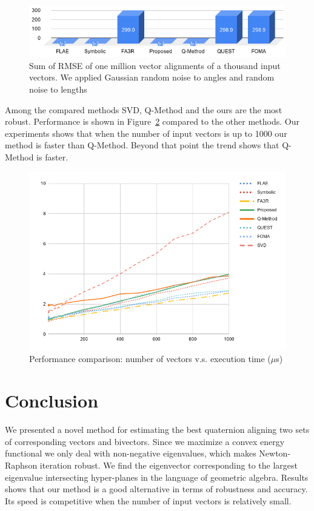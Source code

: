 \documentclass{birkjour}
\numberwithin{equation}{section}
\begin{document}
\begin{figure}[H]
\centering
\includegraphics[width=1.0\textwidth]{robustness.png}
\caption{Sum of RMSE of one million vector alignments of a thousand input vectors. We applied Gaussian random noise to angles and random noise to lengths}
\label{fig:robustness}
\end{figure}

Among the compared methods SVD, Q-Method and the ours are the most robust. Performance is shown in Figure~\ref{fig:time} compared to the other methods. Our experiments shows that when the number of input vectors is up to 1000 our method is faster than Q-Method. Beyond that point the trend shows that Q-Method is faster.

\begin{figure}[H]
	\centering
	\includegraphics[width=1.0\textwidth]{time.png}
	\caption{Performance comparison: number of vectors v.s. execution time ($\mu$s)}
	\label{fig:time}
\end{figure}

\section{Conclusion}

We presented a novel method for estimating the best quaternion aligning two sets of corresponding vectors and bivectors. Since we maximize a convex energy functional we only deal with non-negative eigenvalues, which makes Newton-Raphson iteration robust. We find the eigenvector corresponding to the largest eigenvalue intersecting hyper-planes in the language of geometric algebra. Results shows that our method is a good alternative in terms of robustness and accuracy. Its speed is competitive when the number of input vectors is relatively small. 





\end{document}
